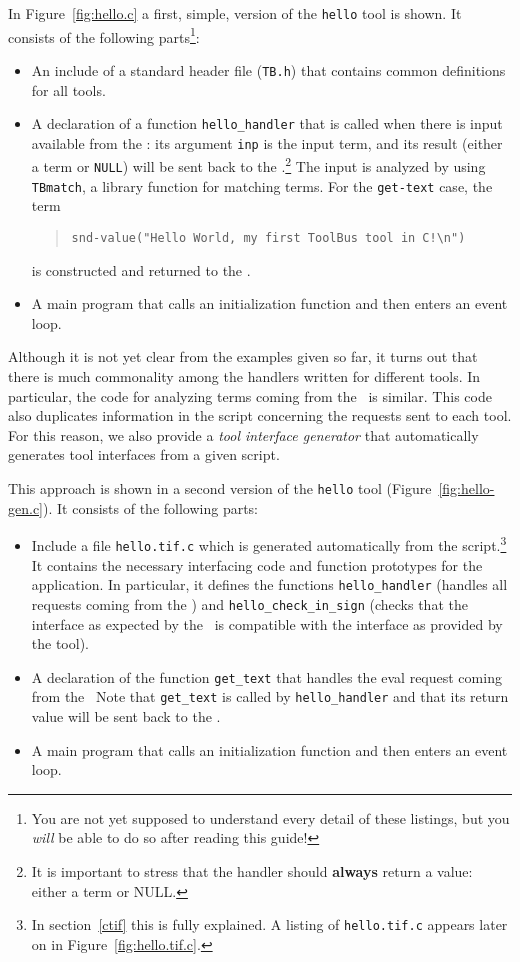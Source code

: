 \documentclass[a4,twoside,noweb]{article} %
\begin{document}
In Figure~\ref{fig:hello.c} a first, simple, version of the {\tt hello} tool
is shown. It consists of the following parts\footnote{
You are not yet supposed to understand every detail of these
listings, but you {\em will} be able to do so after reading this guide!}:
\begin{itemize}
\item An include of a standard header file ({\tt TB.h}) that contains
common definitions for all tools.
\item A declaration of a function {\tt hello\_handler} that is called when there is
input available from the \TB:
its argument {\tt inp} is the input term, and its result (either a term
or {\tt NULL}) will be sent back to the \TB.\footnote{It is important
to stress that the handler should {\bf always} return a value: 
either a term or NULL.}
The input is analyzed by using {\tt TBmatch}, a library function for matching
terms. For the {\tt get-text} case, 
the term
\begin{quote}
\verb+snd-value("Hello World, my first ToolBus tool in C!\n")+
\end{quote}
is constructed and returned to the \TB.

\item A main program that calls an initialization function and
then enters an event loop.

\end{itemize}

Although it is not yet clear from the examples given so far,
it turns out that there is much commonality among the handlers
written for different tools. In particular, the code for analyzing
terms coming from the \TB\ is similar. This code also duplicates
information in the script concerning the requests sent to each tool.
For this reason, we also provide a {\em tool interface generator}
that automatically generates tool interfaces from a given script.

This approach is shown in a second version of
the {\tt hello} tool (Figure~\ref{fig:hello-gen.c}).
It consists of the following parts:
\begin{itemize}
\item Include a file {\tt hello.tif.c} which is generated automatically
from the script.\footnote{In section~\ref{ctif} this is fully explained.
A listing of {\tt hello.tif.c} appears later on in Figure~\ref{fig:hello.tif.c}.}
It contains the necessary interfacing code and
function prototypes for the application.
In particular, it defines the functions
{\tt hello\_handler} (handles all requests coming from
the \TB) and {\tt hello\_check\_in\_sign} (checks
that the interface as expected by the \TB\ is compatible with the
interface as provided by the tool).

\item A declaration of the function {\tt get\_text} that handles the
eval request coming from the \TB\ 
Note that {\tt get\_text} is called by {\tt hello\_handler} and that
its return value will be sent back to the \TB.

\item A main program that calls an initialization function and
then enters an event loop.

\end{itemize}
\end{document}
